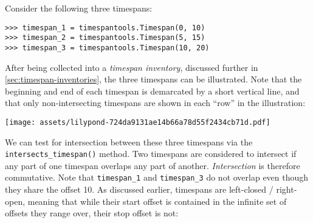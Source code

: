 Consider the following three timespans:

\begin{comment}
<abjad>
timespan_1 = timespantools.Timespan(0, 10)
timespan_2 = timespantools.Timespan(5, 15)
timespan_3 = timespantools.Timespan(10, 20)
</abjad>
\end{comment}

\begin{abjadbookoutput}
\begin{singlespacing}
\vspace{-0.5\baselineskip}
\begin{verbatim}
>>> timespan_1 = timespantools.Timespan(0, 10)
>>> timespan_2 = timespantools.Timespan(5, 15)
>>> timespan_3 = timespantools.Timespan(10, 20)
\end{verbatim}
\end{singlespacing}
\end{abjadbookoutput}

\noindent After being collected into a \emph{timespan inventory}, discussed
further in \autoref{sec:timespan-inventories}, the three timespans can be
illustrated. Note that the beginning and end of each timespan is demarcated by
a short vertical line, and that only non-intersecting timespans are shown in
each \enquote{row} in the illustration:

\begin{comment}
<abjad>[hide=true]
timespan_inventory = timespantools.TimespanInventory([
    timespan_1,
    timespan_2,
    timespan_3,
    ])
show(timespan_inventory)
</abjad>
\end{comment}

\begin{abjadbookoutput}
\begin{singlespacing}
\vspace{-0.5\baselineskip}
\noindent\texttt{[image: assets/lilypond-724da9131ae14b66a78d55f2434cb71d.pdf]}
\end{singlespacing}
\end{abjadbookoutput}

\noindent We can test for intersection between these three timespans via the
\texttt{intersects\_timespan()} method. Two timespans are considered to
intersect if any part of one timespan overlaps any part of another.
\emph{Intersection} is therefore commutative. Note that \texttt{timespan\_1}
and \texttt{timespan\_3} do not overlap even though they share the offset 10.
As discussed earlier, timespans are left-closed / right-open, meaning that
while their start offset is contained in the infinite set of offsets they range
over, their stop offset is not:

